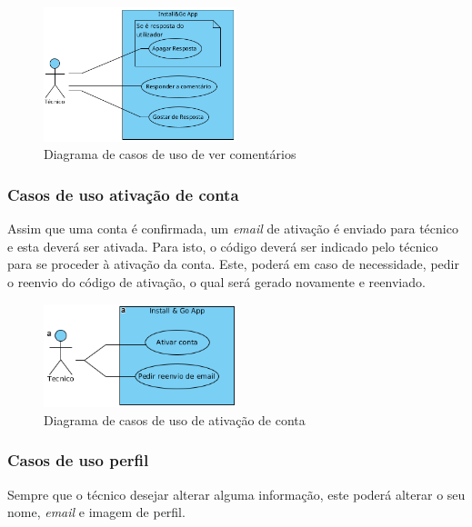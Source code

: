 \begin{figure}[htb]
  \centering
  
  \includegraphics[width=0.5\textwidth]{images/diagramas/casos_de_uso/use_case_topic_comments.png}
  \caption{Diagrama de casos de uso de ver comentários}
  \label{fig:15}
\end{figure}

\subsubsection{Casos de uso ativação de conta}

Assim que uma conta é confirmada, um \textit{email} de ativação é enviado para técnico e esta deverá ser ativada.
Para isto, o código deverá ser indicado pelo técnico para se proceder à ativação da conta. Este, poderá em caso de necessidade, pedir o reenvio do código de ativação, o qual será gerado novamente e reenviado.

\begin{figure}[htb]
  \centering
  
  \includegraphics[width=0.5\textwidth]{images/diagramas/casos_de_uso/use_case_account_validation.png}
  \caption{Diagrama de casos de uso de ativação de conta}
  \label{fig:16}
\end{figure}

\subsubsection{Casos de uso perfil}

Sempre que o técnico desejar alterar alguma informação, este poderá alterar o seu nome, \textit{email} e imagem de perfil.


